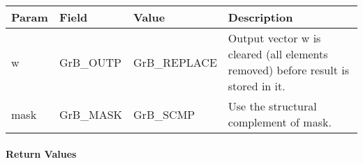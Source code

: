 \begin{itemize}[leftmargin=1.1in]
    \begin{tabular}{lllp{2.5in}}
    Param & Field  & Value & Description \\
    \hline
        {\sf w}    & {\sf GrB\_OUTP} & {\sf GrB\_REPLACE} & Output vector {\sf w} 
        is cleared (all elements removed) before result is stored in it.\\
        
        {\sf mask} & {\sf GrB\_MASK} & {\sf GrB\_SCMP}   & Use the structural 
        complement of {\sf mask}. \\
    \end{tabular}

\end{itemize}

\paragraph{Return Values}

